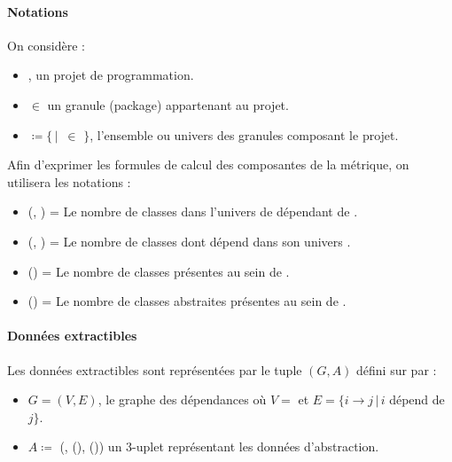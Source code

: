 \documentclass{scrartcl}
\begin{document}
    \paragraph{Notations}On considère :
    \begin{itemize}
        \item \project{}, un projet de programmation.
        \item \granule{} $\in$ \project{} un granule (package) appartenant au projet.
        \item \granuleUniverse{} $\coloneqq \{$\granule{}$ \, | \, $ \granule{} $\in$ \project{}$\}$, l'ensemble ou univers des granules composant le projet.
    \end{itemize}
    Afin d'exprimer les formules de calcul des composantes de la métrique, on utilisera les notations :
    \begin{itemize}
        \item \dependantClasses{}(\granule{}, \granuleUniverse{}) = Le nombre de classes dans l'univers \granuleUniverse{} de \granule{} dépendant de \granule{}.
        \item \dependedClasses{}(\granule{}, \granuleUniverse{}) = Le nombre de classes dont dépend \granule{} dans son univers \granuleUniverse{}.
        \item \numberOfClass{}(\granule{}) = Le nombre de classes présentes au sein de \granule{}.
        \item \numberOfabstractClass{}(\granule{}) = Le nombre de classes abstraites présentes au sein de \granule{}.
    \end{itemize}
    
    \paragraph{Données extractibles}Les données extractibles sont représentées par le tuple $(G, A)$ défini sur \granuleUniverse{} par :
    \begin{itemize}
        \item $G = (V, E)$, le graphe des dépendances où $V = $ \granuleUniverse{} et $E = \{i \to j \, | \, i $ dépend de $j\}$.
        \item $A \coloneqq$ (\granule{}, \numberOfClass{}(\granule{}), \numberOfabstractClass{}(\granule{})) un 3-uplet représentant les données d'abstraction.
    \end{itemize}
    
\end{document}
